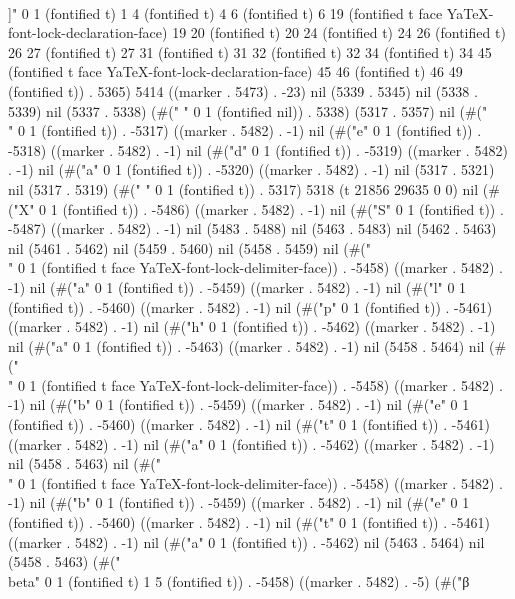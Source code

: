  \\]" 0 1 (fontified t) 1 4 (fontified t) 4 6 (fontified t) 6 19 (fontified t face YaTeX-font-lock-declaration-face) 19 20 (fontified t) 20 24 (fontified t) 24 26 (fontified t) 26 27 (fontified t) 27 31 (fontified t) 31 32 (fontified t) 32 34 (fontified t) 34 45 (fontified t face YaTeX-font-lock-declaration-face) 45 46 (fontified t) 46 49 (fontified t)) . 5365) 5414 ((marker . 5473) . -23) nil (5339 . 5345) nil (5338 . 5339) nil (5337 . 5338) (#(" " 0 1 (fontified nil)) . 5338) (5317 . 5357) nil (#("\\" 0 1 (fontified t)) . -5317) ((marker . 5482) . -1) nil (#("e" 0 1 (fontified t)) . -5318) ((marker . 5482) . -1) nil (#("d" 0 1 (fontified t)) . -5319) ((marker . 5482) . -1) nil (#("a" 0 1 (fontified t)) . -5320) ((marker . 5482) . -1) nil (5317 . 5321) nil (5317 . 5319) (#(" " 0 1 (fontified t)) . 5317) 5318 (t 21856 29635 0 0) nil (#("X" 0 1 (fontified t)) . -5486) ((marker . 5482) . -1) nil (#("S" 0 1 (fontified t)) . -5487) ((marker . 5482) . -1) nil (5483 . 5488) nil (5463 . 5483) nil (5462 . 5463) nil (5461 . 5462) nil (5459 . 5460) nil (5458 . 5459) nil (#("\\" 0 1 (fontified t face YaTeX-font-lock-delimiter-face)) . -5458) ((marker . 5482) . -1) nil (#("a" 0 1 (fontified t)) . -5459) ((marker . 5482) . -1) nil (#("l" 0 1 (fontified t)) . -5460) ((marker . 5482) . -1) nil (#("p" 0 1 (fontified t)) . -5461) ((marker . 5482) . -1) nil (#("h" 0 1 (fontified t)) . -5462) ((marker . 5482) . -1) nil (#("a" 0 1 (fontified t)) . -5463) ((marker . 5482) . -1) nil (5458 . 5464) nil (#("\\" 0 1 (fontified t face YaTeX-font-lock-delimiter-face)) . -5458) ((marker . 5482) . -1) nil (#("b" 0 1 (fontified t)) . -5459) ((marker . 5482) . -1) nil (#("e" 0 1 (fontified t)) . -5460) ((marker . 5482) . -1) nil (#("t" 0 1 (fontified t)) . -5461) ((marker . 5482) . -1) nil (#("a" 0 1 (fontified t)) . -5462) ((marker . 5482) . -1) nil (5458 . 5463) nil (#("\\" 0 1 (fontified t face YaTeX-font-lock-delimiter-face)) . -5458) ((marker . 5482) . -1) nil (#("b" 0 1 (fontified t)) . -5459) ((marker . 5482) . -1) nil (#("e" 0 1 (fontified t)) . -5460) ((marker . 5482) . -1) nil (#("t" 0 1 (fontified t)) . -5461) ((marker . 5482) . -1) nil (#("a" 0 1 (fontified t)) . -5462) nil (5463 . 5464) nil (5458 . 5463) (#("\\beta" 0 1 (fontified t) 1 5 (fontified t)) . -5458) ((marker . 5482) . -5) (#("β
